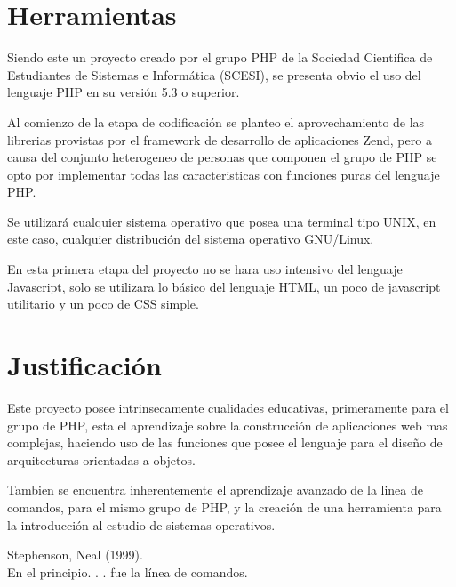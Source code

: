 \documentclass[letterpaper,11pt]{article}
\begin{document}
\section{Herramientas}
Siendo este un proyecto creado por el grupo PHP de la Sociedad Cientifica de
Estudiantes de Sistemas e Informática (SCESI), se presenta obvio el uso del
lenguaje PHP en su versión 5.3 o superior.

Al comienzo de la etapa de codificación se planteo el aprovechamiento de las
librerias provistas por el framework de desarrollo de aplicaciones Zend, pero
a causa del conjunto heterogeneo de personas que componen el grupo de PHP se
opto por implementar todas las caracteristicas con funciones puras del
lenguaje PHP.

Se utilizará cualquier sistema operativo que posea una terminal tipo UNIX, en
este caso, cualquier distribución del sistema operativo GNU/Linux.

En esta primera etapa del proyecto no se hara uso intensivo del lenguaje
Javascript, solo se utilizara lo básico del lenguaje HTML, un poco de
javascript utilitario y un poco de CSS simple.

\section{Justificación}
Este proyecto posee intrinsecamente cualidades educativas, primeramente para
el grupo de PHP, esta el aprendizaje sobre la construcción de aplicaciones web
mas complejas, haciendo uso de las funciones que posee el lenguaje para el
diseño de arquitecturas orientadas a objetos.

Tambien se encuentra inherentemente el aprendizaje avanzado de la linea de comandos, para el mismo grupo de PHP, y la creación de una herramienta para la
introducción al estudio de sistemas operativos.

\begin{thebibliography}{99}

 Stephenson, Neal (1999).\\
En el principio. . . fue la línea de comandos.\\

\end{thebibliography}
\end{document}

